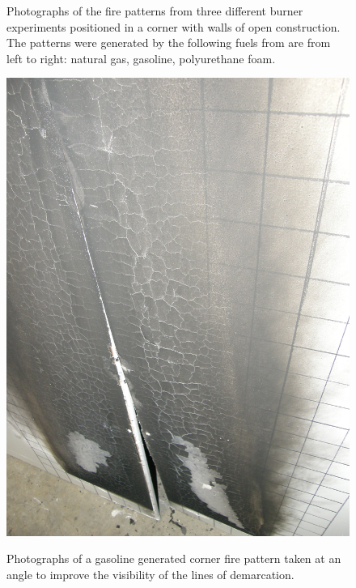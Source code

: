 \documentclass[twoside]{uocthesis}
\begin{document}
{\begin{figure}[p]
	\caption[Photographs of the fire patterns from three different burner experiments positioned in a corner.]{Photographs of the fire patterns from three different burner experiments positioned in a corner with walls of open construction.  The patterns were generated by the following fuels from are from left to right: natural gas, gasoline, polyurethane foam.}
	\label{PT_Corners}
\end{figure}

\begin{figure}[h]
	\includegraphics[width=5in]{../Figures/C_PTGASClose} \\
	
	\caption[Photographs of a gasoline generated corner fire pattern taken at an angle.]{Photographs of a gasoline generated corner fire pattern taken at an angle to improve the visibility of the lines of demarcation.}
	\label{C_PTGASClose}
\end{figure}

}
\end{document}
